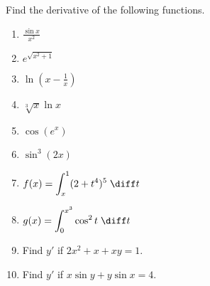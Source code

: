 
Find the derivative of the following functions.
\begin{multicols}{2}
\begin{enumerate}
\item ${\displaystyle \frac{\sin x}{x^2}}$

\item ${\displaystyle e^{\sqrt{x^2 + 1}}}$

\item ${\displaystyle \ln \left(x-\frac{1}{x} \right)}$

\item ${\displaystyle \sqrt[3]{x} \ln x}$

\item ${\displaystyle \cos(e^x)}$

\item ${\displaystyle \sin^3(2x)}$

\item ${\displaystyle f(x) = \int_x^1 (2+t^4)^5 \; \diff t}$

\item ${\displaystyle g(x) = \int_{0}^{x^3} \cos^2 t \; \diff t}$

\item Find $y'$ if $2x^2 + x + xy = 1$.

\item Find $y'$ if $x \sin y + y \sin x = 4$.

\end{enumerate}
\end{multicols}
